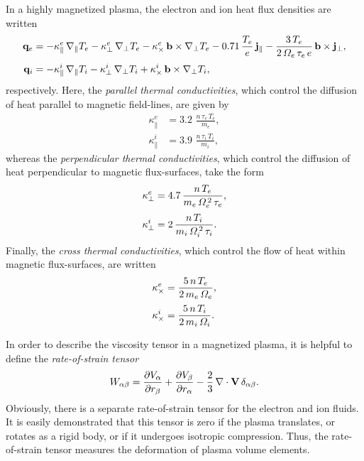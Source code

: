 \documentclass[notitlepage,12pt]{article}
\begin{document}
In a highly magnetized plasma, the electron and ion heat flux densities are written 
\begin{align}
{\bf q}_e &= -\kappa_\parallel^e\,\nabla_\parallel T_e -\kappa_\perp^e\,
\nabla_\perp T_e
-\kappa_\times^e\,{\bf b}\times\nabla_\perp T_e- 0.71\,\frac{T_e}{e}\,{\bf j}_\parallel-
\frac{3\,T_e}{2\,{\mit\Omega}_e\,\tau_e\,e}\,{\bf b}\times{\bf j}_\perp,\label{e3.94a}\\[0.5ex]
{\bf q}_i &= -\kappa_\parallel^i\,\nabla_\parallel T_i -\kappa_\perp^i\,
\nabla_\perp T_i
+\kappa_\times^i\,{\bf b}\times\nabla_\perp T_i,\label{e3.94b}
\end{align}
respectively. Here, the {\em parallel thermal conductivities}, which control the diffusion of heat parallel to magnetic field-lines, are 
given by
\begin{align}\label{e3.87a}
\kappa_\parallel^e &= 3.2\,\,\frac{n\,\tau_e\,T_e}{m_e},\\[0.5ex]
\kappa_\parallel^i &= 3.9\,\,\frac{n\,\tau_i\,T_i}{m_i},\label{e3.87b}
\end{align} 
whereas the {\em perpendicular thermal conductivities}, which control the diffusion of heat perpendicular to magnetic flux-surfaces, take the form
\begin{align}
\kappa_\perp^e &= 4.7\,\frac{n\,T_e}{m_e\,{\mit\Omega}_e^{\,2}\,\tau_e},\\[0.5ex]
\kappa_\perp^i &= 2\, \frac{n\,T_i}{m_i\,{\mit\Omega}_i^{\,2}\,\tau_i}.
\end{align}
Finally, the {\em cross thermal conductivities}, which control the flow of heat within magnetic flux-surfaces,  are written
\begin{align}
\kappa_\times^e &= \frac{5\,n\,T_e}{2\,m_e\,{\mit\Omega}_e},\\[0.5ex]
\kappa_\times^i &=\frac{5\,n\,T_i}{2\,m_i\,{\mit\Omega}_i}.
\end{align}

In order to describe the viscosity tensor in a magnetized plasma, it is
helpful to define the {\em rate-of-strain tensor}  
\begin{equation}
W_{\alpha\beta} = \frac{\partial V_\alpha}{\partial r_\beta}
+ \frac{\partial V_\beta}{\partial r_\alpha} - \frac{2}{3} \,\nabla\cdot{\bf V}\,
\delta_{\alpha\beta}.
\end{equation}
Obviously, there is a separate rate-of-strain tensor for the electron and ion
fluids. It is easily demonstrated that this tensor is zero if the plasma
translates, or rotates as a rigid body, or if it undergoes isotropic
compression. Thus, the rate-of-strain tensor measures the  deformation  of
plasma volume elements. 
\end{document}
